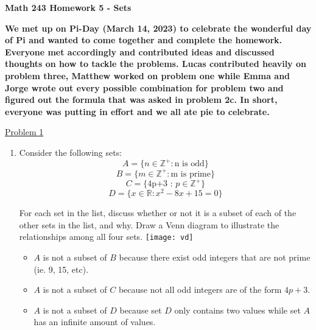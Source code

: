 \documentclass{article}
\newcommand{\R}{\mathbb{R}}
\newcommand{\Z}{\mathbb{Z}}
\begin{document}
\noindent\textbf{Math 243 \hfill Homework 5 - Sets}

\textbf{We met up on Pi-Day (March 14, 2023) to celebrate 
the wonderful day of Pi and wanted to come together and 
complete the homework. Everyone met accordingly and 
contributed ideas and discussed thoughts on how to tackle 
the problems. Lucas contributed heavily on problem three, 
Matthew worked on problem one while Emma and Jorge wrote 
out every possible combination for problem two and figured 
out the formula that was asked in problem 2c. In short, 
everyone was putting in effort and we all ate pie to 
celebrate.}

\pagebreak 

\underline{Problem 1}

\begin{enumerate}
    \item Consider the following sets:
$$A = \{n \in \Z^+ : \text{n is odd}\}$$
$$B = \{m\in\Z^+:\text{m is prime}\}$$
$$C = \{\text{4p+3 : }p\in\Z^+\}$$
$$D = \{x\in\R: x^2-8x+15=0 \}$$

For each set in the list, discuss whether or not it is a subset of 
each of the other sets in the list, and why. Draw a Venn diagram to 
illustrate the relationships among all four sets.
\centering
\texttt{[image: vd]}

\begin{itemize}
    \item $A$ is not a subset of $B$ because there exist odd integers 
    that are not prime (ie. 9, 15, etc).
    \item $A$ is not a subset of $C$ because not all odd integers are 
    of the form $4p + 3$.
    \item $A$ is not a subset of $D$ because set $D$ only contains two values while set $A$ has an
    infinite amount of values.
    
\end{itemize}



\end{enumerate}
\end{document}

